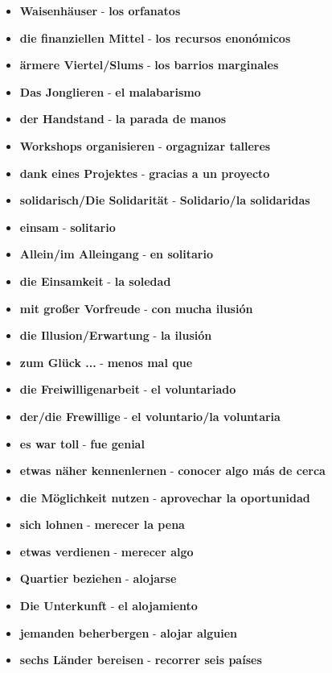 \documentclass{article}
\begin{document}
\begin{multicols}{2}
\begin{itemize}
		\item{\textbf{Waisenhäuser} - \textbf{los orfanatos}}
		\item{\textbf{die finanziellen Mittel} - \textbf{los recursos enonómicos}}
		\item{\textbf{ärmere Viertel/Slums} - \textbf{los barrios marginales}}
		\item{\textbf{Das Jonglieren} - \textbf{el malabarismo}}
		\item{\textbf{der Handstand} - \textbf{la parada de manos}}
		\item{\textbf{Workshops organisieren} - \textbf{orgagnizar talleres}}
		\item{\textbf{dank eines Projektes} - \textbf{gracias a un proyecto}}
		\item{\textbf{solidarisch/Die Solidarität} - \textbf{Solidario/la solidaridas}}
		\item{\textbf{einsam} - \textbf{solitario}}
		\item{\textbf{Allein/im Alleingang} - \textbf{en solitario}}
		\item{\textbf{die Einsamkeit} - \textbf{la soledad}}
		\item{\textbf{mit großer Vorfreude} - \textbf{con mucha ilusión}}
		\item{\textbf{die Illusion/Erwartung} - \textbf{la ilusión}}
		\item{\textbf{zum Glück ...} - \textbf{menos mal que}}
		\item{\textbf{die Freiwilligenarbeit} - \textbf{el voluntariado}}
		\item{\textbf{der/die Frewillige} - \textbf{el voluntario/la voluntaria}}
		\item{\textbf{es war toll} - \textbf{fue genial}}
		\item{\textbf{etwas näher kennenlernen} - \textbf{conocer algo más de cerca}}
		\item{\textbf{die Möglichkeit nutzen} - \textbf{aprovechar la oportunidad}}
		\item{\textbf{sich lohnen} - \textbf{merecer la pena}}
		\item{\textbf{etwas verdienen} - \textbf{merecer algo}}
		\item{\textbf{Quartier beziehen} - \textbf{alojarse}}
		\item{\textbf{Die Unterkunft} - \textbf{el alojamiento}}
		\item{\textbf{jemanden beherbergen} - \textbf{alojar alguien}}
		\item{\textbf{sechs Länder bereisen} - \textbf{recorrer seis países}}

\end{itemize}
\end{multicols}
\end{document}
